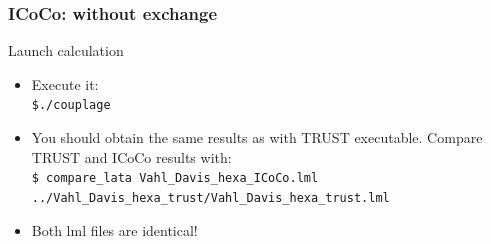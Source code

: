 \documentclass[10pt, hyperref={unicode=true,pdfusetitle, bookmarks=true,bookmarksnumbered=false,bookmarksopen=false, breaklinks=false,pdfborder={0 0 1},backref=true,colorlinks=true,linkcolor=darkblue,pageanchor, urlcolor=darkblue}]{beamer}
\begin{document}
\begin{frame}
\frametitle{ICoCo: without exchange}

\begin{block}{Launch calculation}
\begin{itemize}
\item Execute it:\\
\texttt{\$./couplage}
\item You should obtain the same results as with TRUST executable. Compare TRUST and ICoCo results with:\\
\texttt{\$ compare\_lata Vahl\_Davis\_hexa\_ICoCo.lml ../Vahl\_Davis\_hexa\_trust/Vahl\_Davis\_hexa\_trust.lml}
\item Both lml files are identical!
\end{itemize}

\end{block}
\end{frame}
\end{document}
